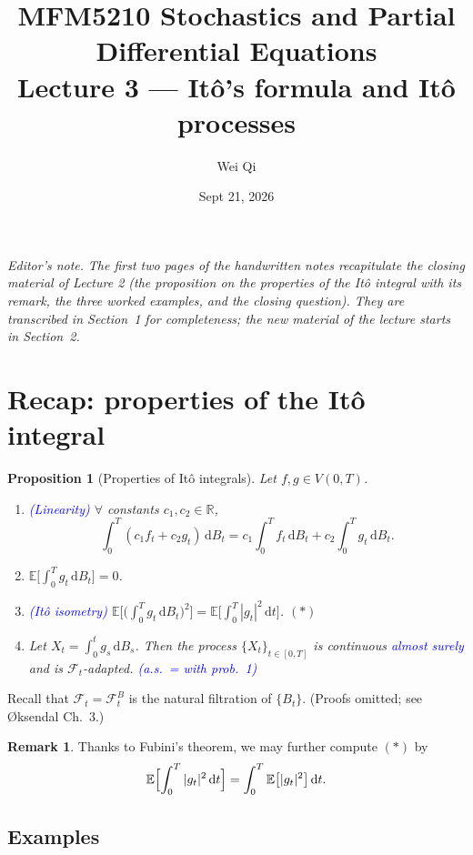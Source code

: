 \documentclass[11pt]{article}
\title{\textbf{MFM5210 Stochastics and Partial Differential Equations}\\[4pt]
\large Lecture 3 --- It\^o's formula and It\^o processes}
\author{Wei Qi}
\date{Sept 21, 2026}
\newcommand{\E}{\mathbb{E}}
\newcommand{\R}{\mathbb{R}}
\newcommand{\F}{\mathcal{F}}
\newcommand{\dd}{\,\mathrm{d}}
\newcommand{\ann}[1]{\textcolor{blue}{#1}}
\theoremstyle{definition}
\newtheorem{remark}{Remark}[section]
\theoremstyle{plain}
\newtheorem{proposition}{Proposition}[section]
\begin{document}
\maketitle

\medskip
\noindent\textit{\textcolor{red!70!black}{Editor's note.}} \textit{The first two pages of the
handwritten notes recapitulate the closing material of Lecture 2 (the proposition on the
properties of the It\^o integral with its remark, the three worked examples, and the closing
question). They are transcribed in Section~1 for completeness; the new material of the lecture
starts in Section~2.}

\section{Recap: properties of the It\^o integral}

\begin{proposition}[Properties of It\^o integrals]
Let $f,g\in V(0,T)$.
\begin{enumerate}
\item[(i)] \ann{(Linearity)} $\forall$ constants $c_1,c_2\in\R$,
      \[
        \int_0^T(c_1f_t+c_2g_t)\dd B_t
        =c_1\int_0^Tf_t\dd B_t+c_2\int_0^Tg_t\dd B_t .
      \]
\item[(ii)] $\E\bigl[\int_0^Tg_t\dd B_t\bigr]=0$.
\item[(iii)] \ann{(It\^o isometry)}
      $\E\bigl[\bigl(\int_0^Tg_t\dd B_t\bigr)^2\bigr]
       =\E\bigl[\int_0^T|g_t|^2\dd t\bigr]$. \hfill$(\ast)$
\item[(iv)] Let $X_t=\int_0^tg_s\dd B_s$. Then the process $\{X_t\}_{t\in[0,T]}$ is
      continuous \ann{almost surely} and is $\F_t$-adapted.
      \ann{(a.s.\ = with prob.\ 1)}
\end{enumerate}
\end{proposition}

\noindent Recall that $\F_t=\F_t^B$ is the natural filtration of $\{B_t\}$. \;
(Proofs omitted; see \O ksendal Ch.~3.)

\begin{remark}
Thanks to Fubini's theorem, we may further compute $(\ast)$ by
\[
  \E\Bigl[\int_0^T|g_t|^2\dd t\Bigr]=\int_0^T\E\bigl[|g_t|^2\bigr]\dd t .
\]
\end{remark}

\subsection*{Examples}
\end{document}
